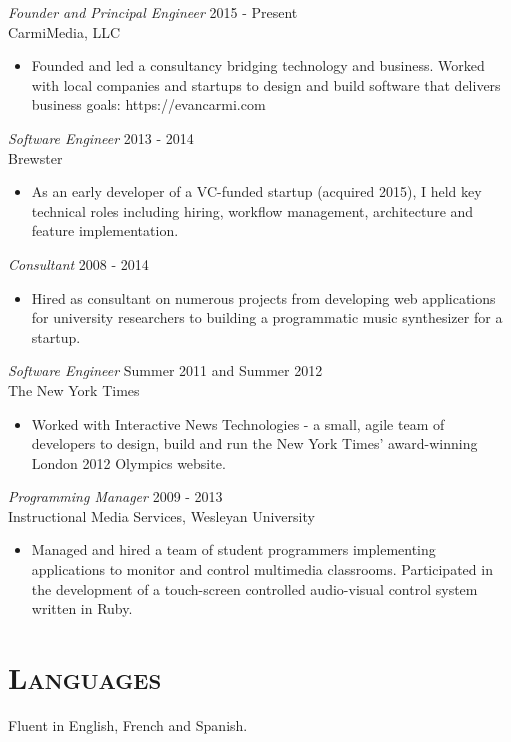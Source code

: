 \documentclass[margin]{res}
\begin{document}
\begin{resume}
    {\sl Founder and Principal Engineer} \hfill 2015 - Present \\ CarmiMedia, LLC
    \begin{itemize}  \itemsep -2pt %
        \item Founded and led a consultancy bridging technology and business. Worked with local companies and startups to design and build software that delivers business goals: https://evancarmi.com
    \end{itemize}

    {\sl Software Engineer} \hfill 2013 - 2014 \\ Brewster
    \begin{itemize}  \itemsep -2pt %
        \item As an early developer of a VC-funded startup (acquired 2015), I held key technical roles including hiring, workflow management, architecture and feature implementation.
    \end{itemize}

    {\sl Consultant} \hfill 2008 - 2014
    \begin{itemize}  \itemsep -2pt %
        \item Hired as consultant on numerous projects from developing web applications for university researchers to building a programmatic music synthesizer for a startup.
    \end{itemize}

    {\sl Software Engineer} \hfill Summer 2011 and Summer 2012 \\
    The New York Times
    \begin{itemize}  \itemsep -2pt %
        \item Worked with Interactive News Technologies - a small, agile team of developers to design, build and run the New York Times' award-winning London 2012 Olympics website.
    \end{itemize}

    {\sl Programming Manager} \hfill 2009 - 2013 \\
    Instructional Media Services, Wesleyan University
    \begin{itemize}  \itemsep -2pt %
        \item Managed and hired a team of student programmers implementing applications to monitor and control multimedia classrooms. Participated in the development of a touch-screen controlled audio-visual control system written in Ruby.
    \end{itemize}

\section{\textsc{Languages}} Fluent in English, French and Spanish.

\end{resume}
\end{document}
